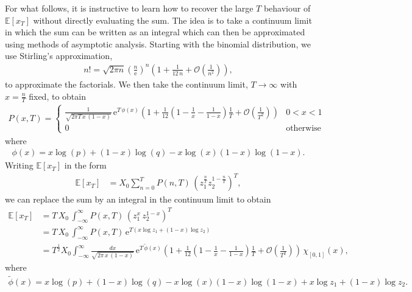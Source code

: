 \documentclass[11pt]{article}
\begin{document}
For what follows, it is instructive to learn how to recover the large $T$ behaviour of $\mathbb{E}\left[x_T \right]$ without directly evaluating the sum.
The idea is to take a continuum limit in which the sum can be written as an integral which can then be approximated using methods of asymptotic analysis.
Starting with the binomial distribution, we use Stirling's approximation,
\begin{align}
n! = \sqrt{2 \pi n} \left( \frac{n}{\mathrm{e}}\right)^n\left(1 + \frac{1}{12\,n} + \mathcal{O}\left(\frac{1}{n^2}\right)\right),
\end{align}
to approximate the factorials. We then take the continuum limit, $T\to \infty$ with $x=\frac{n}{T}$ fixed,
 to obtain 
\begin{align}
\label{eq-binomial-distribution-cts-limit}
P(x, T) = \left\{
\begin{array}{ll}
\frac{1}{\sqrt{2 \pi T \,x\,(1-x)}}\,\mathrm{e}^{T\,\phi(x)}\left(1 + \frac{1}{12}\left( 1-\frac{1}{x} - \frac{1}{1-x}\right) \frac{1}{T}   + \mathcal{O}\left(\frac{1}{T^2}\right)\right) & 0 < x< 1\\
0 & \text{otherwise}
\end{array}
\right.
\end{align}
where
\begin{align}
\phi(x) =    x \log(p) +  (1 - x) \log (q)  - x \log(x)  (1 - x) \log(1 - x).
\end{align}
Writing $\mathbb{E}\left[x_T \right]$ in the form
\begin{align*}
\mathbb{E}\left[x_T \right] &=   X_0 \sum_{n=0}^T  P(n,T) \, \left(z_1^\frac{n}{T} z_2^{1-\frac{n}{T}}\right)^T,
\end{align*}
we can replace the sum by an integral in the continuum limit to obtain
\begin{align}
\nonumber \mathbb{E}\left[x_T \right] &=   T\,X_0\, \int_{-\infty}^\infty P(x, T)\,\left( z_1^x\,z_2^{1-x}\right)^T\\ 
\nonumber & = T\,X_0\, \int_{-\infty}^\infty P(x, T)\,\mathrm{e}^{T\left(x\log z_1 + (1-x)\log z_2 \right)}\\
\label{eq-Ex-mult1} & = T^\frac{1}{2} X_0  \int_{-\infty}^\infty  \frac{d x}{\sqrt{2 \pi \,x\,(1-x)}}\,\mathrm{e}^{T\,\widetilde{\phi}(x)}\left(1 + \frac{1}{12}\left( 1-\frac{1}{x} - \frac{1}{1-x}\right) \frac{1}{T}   + \mathcal{O}\left(\frac{1}{T^2}\right)\right) \, \chi_{\left[0, 1\right]}(x),
\end{align}
where 
\begin{align}
\widetilde{\phi}(x) =  x \log(p) +  (1 - x) \log (q)  - x \log(x)  (1 - x) \log(1 - x) + x \log z_1 +  (1-x)\log z_2.
\end{align}
\end{document}
